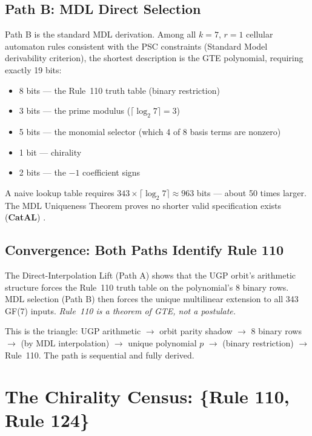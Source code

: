 \documentclass[11pt,a4paper]{article}
\newcommand{\CatAL}{\textbf{CatAL}}
\begin{document}
\subsection{Path B: MDL Direct Selection}

Path B is the standard MDL derivation.  Among all $k=7$, $r=1$ cellular
automaton rules consistent with the PSC constraints (Standard Model
derivability criterion), the shortest description is the GTE polynomial,
requiring exactly 19 bits:

\begin{itemize}[itemsep=2pt]
  \item 8 bits — the Rule~110 truth table (binary restriction)
  \item 3 bits — the prime modulus ($\lceil\log_2 7\rceil = 3$)
  \item 5 bits — the monomial selector (which 4 of 8 basis terms are nonzero)
  \item 1 bit — chirality
  \item 2 bits — the $-1$ coefficient signs
\end{itemize}

A naive lookup table requires $343 \times \lceil\log_2 7\rceil \approx 963$
bits — about 50 times larger.  The MDL Uniqueness Theorem proves no shorter
valid specification exists (\CatAL) \cite{SpivackGTEPolynomialWolfram}.

\subsection{Convergence: Both Paths Identify Rule 110}

The Direct-Interpolation Lift (Path A) shows that the UGP orbit's arithmetic
structure forces the Rule~110 truth table on the polynomial's 8 binary rows.
MDL selection (Path B) then forces the unique multilinear extension to all
343 GF(7) inputs.  \emph{Rule~110 is a theorem of GTE, not a postulate.}

This is the triangle: UGP arithmetic $\to$ orbit parity shadow $\to$ 8 binary
rows $\to$ (by MDL interpolation) $\to$ unique polynomial $p$ $\to$ (binary
restriction) $\to$ Rule~110.  The path is sequential and fully derived.

\section{The Chirality Census: \{Rule 110, Rule 124\}}
\label{sec:chirality}
\end{document}

